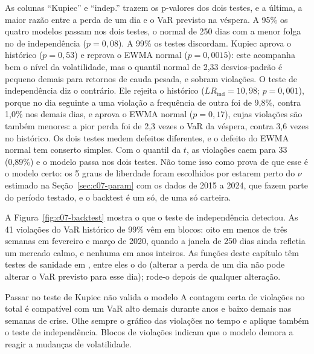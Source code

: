 As colunas ``Kupiec'' e ``indep.'' trazem os p-valores dos dois testes, e a última, a maior razão entre a perda de um dia e o VaR previsto na véspera. A 95\% os quatro modelos passam nos dois testes, o normal de 250 dias com a menor folga no de independência ($p = 0,08$). A 99\% os testes discordam. Kupiec aprova o histórico ($p = 0,53$) e reprova o EWMA normal ($p = 0,0015$): este acompanha bem o nível da volatilidade, mas o quantil normal de 2,33 desvios-padrão é pequeno demais para retornos de cauda pesada, e sobram violações. O teste de independência diz o contrário. Ele rejeita o histórico ($LR_{\text{ind}} = 10,98$; $p = 0,001$), porque no dia seguinte a uma violação a frequência de outra foi de 9,8\%, contra 1,0\% nos demais dias, e aprova o EWMA normal ($p = 0,17$), cujas violações são também menores: a pior perda foi de 2,3 vezes o VaR da véspera, contra 3,6 vezes no histórico. Os dois testes medem defeitos diferentes, e o defeito do EWMA normal tem conserto simples. Com o quantil da $t$, as violações caem para 33 (0,89\%) e o modelo passa nos dois testes. Não tome isso como prova de que esse é o modelo certo: os 5 graus de liberdade foram escolhidos por estarem perto do $\nu$ estimado na Seção~\ref{sec:c07-param} com os dados de 2015 a 2024, que fazem parte do período testado, e o backtest é um só, de uma só carteira.


A Figura~\ref{fig:c07-backtest} mostra o que o teste de independência detectou. As 41 violações do VaR histórico de 99\% vêm em blocos: oito em menos de três semanas em fevereiro e março de 2020, quando a janela de 250 dias ainda refletia um mercado calmo, e nenhuma em anos inteiros. As funções deste capítulo têm testes de sanidade em , entre eles o do  (alterar a perda de um dia não pode alterar o VaR previsto para esse dia); rode-o depois de qualquer alteração.

\begin{armadilha}{Passar no teste de Kupiec não valida o modelo}
A contagem certa de violações no total é compatível com um VaR alto demais durante anos e baixo demais nas semanas de crise. Olhe sempre o gráfico das violações no tempo e aplique também o teste de independência. Blocos de violações indicam que o modelo demora a reagir a mudanças de volatilidade.
\end{armadilha}

